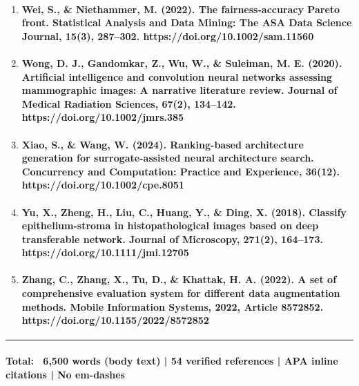 \begin{enumerate}
  \paragraph{Wang, R., Chen, F., Chen, H., Zhang, Z., Zhou, S., \& Liu, H. (2025). Deep learning in digital breast tomosynthesis: Current status, challenges, and future trends. MedComm, 6(6). https://doi.org/10.1002/mco2.70247}
\item
  \paragraph{Wei, S., \& Niethammer, M. (2022). The fairness-accuracy Pareto front. Statistical Analysis and Data Mining: The ASA Data Science Journal, 15(3), 287–302. https://doi.org/10.1002/sam.11560}
\item
  \paragraph{Wong, D. J., Gandomkar, Z., Wu, W., \& Suleiman, M. E. (2020). Artificial intelligence and convolution neural networks assessing mammographic images: A narrative literature review. Journal of Medical Radiation Sciences, 67(2), 134–142. https://doi.org/10.1002/jmrs.385}
\item
  \paragraph{Xiao, S., \& Wang, W. (2024). Ranking-based architecture generation for surrogate-assisted neural architecture search. Concurrency and Computation: Practice and Experience, 36(12). https://doi.org/10.1002/cpe.8051}
\item
  \paragraph{Yu, X., Zheng, H., Liu, C., Huang, Y., \& Ding, X. (2018). Classify epithelium-stroma in histopathological images based on deep transferable network. Journal of Microscopy, 271(2), 164–173. https://doi.org/10.1111/jmi.12705}
\item
  \paragraph{Zhang, C., Zhang, X., Tu, D., \& Khattak, H. A. (2022). A set of comprehensive evaluation system for different data augmentation methods. Mobile Information Systems, 2022, Article 8572852. https://doi.org/10.1155/2022/8572852}
\end{enumerate}

\begin{center}\rule{0.5\linewidth}{0.5pt}\end{center}

\paragraph{Total: ~6,500 words (body text) | 54 verified references | APA inline citations | No em-dashes}
